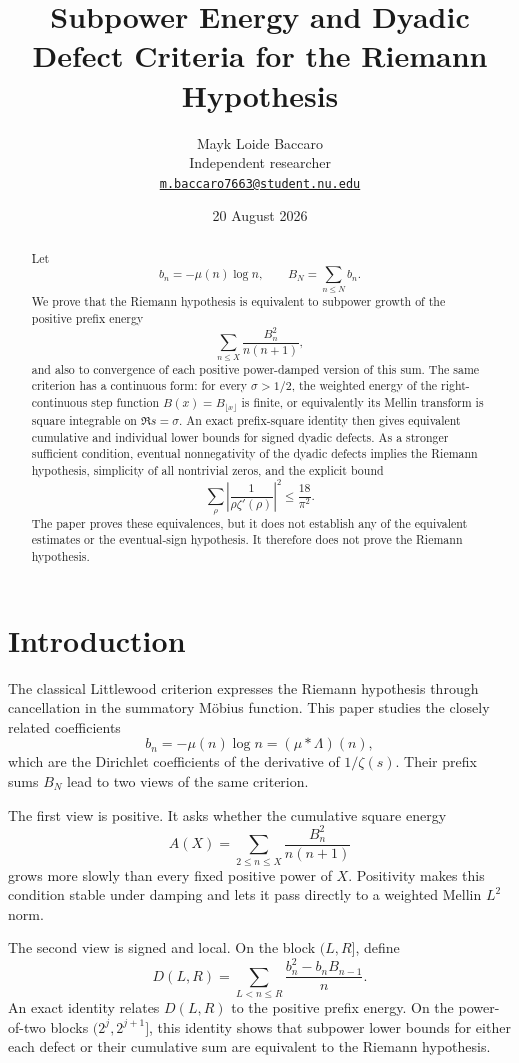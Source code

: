 \documentclass[11pt,a4paper]{amsart}
\title[Energy and dyadic defect criteria]{Subpower Energy and Dyadic Defect Criteria for the Riemann Hypothesis}
\author[Mayk Loide Baccaro]{Mayk Loide Baccaro\\
Independent researcher\\
\href{mailto:m.baccaro7663@student.nu.edu}{\texttt{m.baccaro7663@student.nu.edu}}}
\date{20 August 2026}
\theoremstyle{definition}
\theoremstyle{remark}
\begin{document}
\begin{abstract}
Let
\[
 b_n=-\mu(n)\log n,
 \qquad B_N=\sum_{n\leq N}b_n.
\]
We prove that the Riemann hypothesis is equivalent to subpower growth of the
positive prefix energy
\[
 \sum_{n\leq X}\frac{B_n^2}{n(n+1)},
\]
and also to convergence of each positive power-damped version of this sum.
The same criterion has a continuous form: for every $\sigma>1/2$, the
weighted energy of the right-continuous step function $B(x)=B_{\lfloor
x\rfloor}$ is finite, or equivalently its Mellin transform is square
integrable on $\Re s=\sigma$.  An exact prefix-square identity then gives
equivalent cumulative and individual lower bounds for signed dyadic defects.
As a stronger sufficient condition, eventual nonnegativity of the dyadic
defects implies the Riemann hypothesis, simplicity of all nontrivial zeros,
and the explicit bound
\[
 \sum_{\rho}\left|\frac{1}{\rho\zeta'(\rho)}\right|^2
 \leq \frac{18}{\pi^2}.
\]
The paper proves these equivalences, but it does not establish any of the
equivalent estimates or the eventual-sign hypothesis.  It therefore does
not prove the Riemann hypothesis.
\end{abstract}

\maketitle

\section{Introduction}

The classical Littlewood criterion expresses the Riemann hypothesis through
cancellation in the summatory M\"obius function.  This paper studies the
closely related coefficients
\[
 b_n=-\mu(n)\log n=(\mu*\Lambda)(n),
\]
which are the Dirichlet coefficients of the derivative of $1/\zeta(s)$.
Their prefix sums $B_N$ lead to two views of the same criterion.

The first view is positive.  It asks whether the cumulative square energy
\[
 A(X)=\sum_{2\leq n\leq X}\frac{B_n^2}{n(n+1)}
\]
grows more slowly than every fixed positive power of $X$.  Positivity makes
this condition stable under damping and lets it pass directly to a weighted
Mellin $L^2$ norm.

The second view is signed and local.  On the block $(L,R]$, define
\[
 D(L,R)=\sum_{L<n\leq R}
 \frac{b_n^2-b_nB_{n-1}}{n}.
\]
An exact identity relates $D(L,R)$ to the positive prefix energy.  On the
power-of-two blocks $(2^j,2^{j+1}]$, this identity shows that subpower lower
bounds for either each defect or their cumulative sum are equivalent to the
Riemann hypothesis.
\end{document}
